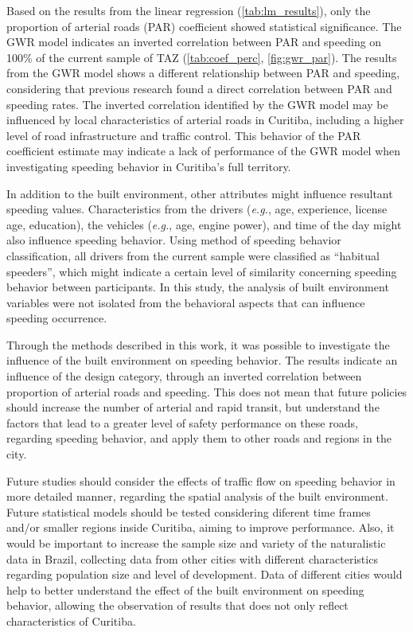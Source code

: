 Based on the results from the linear regression (\autoref{tab:lm_results}), only the proportion of arterial roads (PAR) coefficient showed statistical significance. The GWR model indicates an inverted correlation between PAR and speeding on 100\% of the current sample of TAZ (\autoref{tab:coef_perc}, \autoref{fig:gwr_par}). The results from the GWR model shows a different relationship between PAR and speeding, considering that previous research found a direct correlation between PAR and speeding rates. The inverted correlation identified by the GWR model may be influenced by local characteristics of arterial roads in Curitiba, including a higher level of road infrastructure and traffic control. This behavior of the PAR coefficient estimate may indicate a lack of performance of the GWR model when investigating speeding behavior in Curitiba's full territory.

In addition to the built environment, other attributes might influence resultant speeding values. Characteristics from the drivers (\textit{e.g.}, age, experience, license age, education), the vehicles (\textit{e.g.}, age, engine power), and time of the day might also influence speeding behavior. Using \textcite{Richard2013a} method of speeding behavior classification, all drivers from the current sample were classified as ``habitual speeders'', which might indicate a certain level of similarity concerning speeding behavior between participants. In this study, the analysis of built environment variables were not isolated from the behavioral aspects that can influence speeding occurrence.

Through the methods described in this work, it was possible to investigate the influence of the built environment on speeding behavior. The results indicate an influence of the design category, through an inverted correlation between proportion of arterial roads and speeding. This does not mean that future policies should increase the number of arterial and rapid transit, but understand the factors that lead to a greater level of safety performance on these roads, regarding speeding behavior, and apply them to other roads and regions in the city. 

Future studies should consider the effects of traffic flow on speeding behavior in more detailed manner, regarding the spatial analysis of the built environment. Future statistical models should be tested considering diferent time frames and/or smaller regions inside Curitiba, aiming to improve performance. Also, it would be important to increase the sample size and variety of the naturalistic data in Brazil, collecting data from other cities with different characteristics regarding population size and level of development. Data of different cities would help to better understand the effect of the built environment on speeding behavior, allowing the observation of results that does not only reflect characteristics of Curitiba. 